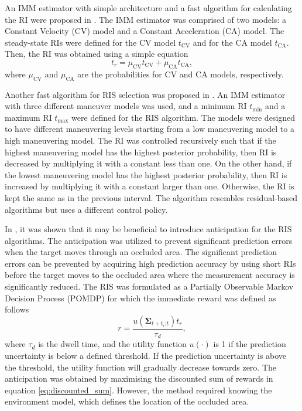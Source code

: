 \documentclass[english, 12pt, a4paper, elec, utf8, a-1b, online]{aaltothesis}
\numberwithin{equation}{section}
\renewcommand{\vec}[1]{\mathbf{#1}}
\newcommand{\tmax}{t_\text{max}}
\newcommand{\tmin}{t_\text{min}}
\newcommand{\muca}{\mu_{\text{CA}}}
\newcommand{\mucv}{\mu_{\text{CV}}}
\newcommand{\ri}{t_r}
\begin{document}
 An IMM estimator with simple architecture and a fast algorithm for calculating the RI were proposed in \cite{Benoudnine2006}.
The IMM estimator was comprised of two models: a Constant Velocity (CV) model and a Constant Acceleration (CA) model.
The steady-state RIs were defined for the CV model $t_\text{CV}$ and for the CA model $t_\text{CA}$.
Then, the RI was obtained using a simple equation
\begin{equation}\label{eq:fimm}
    \ri = \mucv t_\text{CV} + \muca t_\text{CA},
\end{equation}
where $\mucv$ and $\muca$ are the probabilities for CV and CA models, respectively.

Another fast algorithm for RIS selection was proposed in \cite{MasoumiGanjgah2017}.
An IMM estimator with three different maneuver models was used, and a minimum RI $\tmin$ and a maximum RI $\tmax$ were defined for the RIS algorithm.
The models were designed to have different maneuvering levels starting from a low maneuvering model to a high maneuvering model.
The RI was controlled recursively such that if the highest maneuvering model has the highest posterior probability, then RI is decreased by multiplying it with a constant less than one.
On the other hand, if the lowest maneuvering model has the highest posterior probability, then RI is increased by multiplying it with a constant larger than one.
Otherwise, the RI is kept the same as in the previous interval.
The algorithm resembles residual-based algorithms but uses a different control policy.

In \cite{Charlish2015}, it was shown that it may be beneficial to introduce anticipation for the RIS algorithms.
The anticipation was utilized to prevent significant prediction errors when the target moves through an occluded area.
The significant prediction errors can be prevented by acquiring high prediction accuracy by using short RIs before the target moves to the occluded area where the measurement accuracy is significantly reduced.
The RIS was formulated as a Partially Observable Markov Decision Process (POMDP) for which the immediate reward was defined as follows
\begin{equation}
    r = \frac{u\left(\vec{\Sigma}_{t+\ri|t} \right) \ri}{\tau_d},
\end{equation}
where $\tau_d$ is the dwell time, and the utility function $u(\cdot)$ is 1 if the prediction uncertainty is below a defined threshold.
If the prediction uncertainty is above the threshold, the utility function will gradually decrease towards zero.
The anticipation was obtained by maximising the discounted sum of rewards in equation \eqref{eq:discounted_sum}.
However, the method required knowing the environment model, which defines the location of the occluded area.
\end{document}
